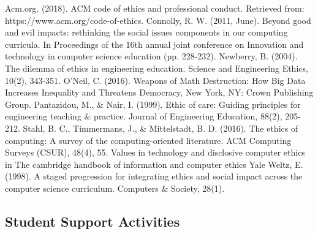 Acm.org. (2018). ACM code of ethics and professional conduct. Retrieved from: https://www.acm.org/code-of-ethics.
Connolly, R. W. (2011, June). Beyond good and evil impacts: rethinking the social issues components in our computing curricula. In Proceedings of the 16th annual joint conference on Innovation and technology in computer science education (pp. 228-232).
Newberry, B. (2004). The dilemma of ethics in engineering education. Science and Engineering Ethics, 10(2), 343-351.
O’Neil, C. (2016). Weapons of Math Destruction: How Big Data Increases Inequality and Threatens Democracy, New York, NY: Crown Publishing Group.
Pantazidou, M., \& Nair, I. (1999). Ethic of care: Guiding principles for engineering teaching \& practice. Journal of Engineering Education, 88(2), 205-212.
Stahl, B. C., Timmermans, J., \& Mittelstadt, B. D. (2016). The ethics of computing: A survey of the computing-oriented literature. ACM Computing Surveys (CSUR), 48(4), 55.
Values in technology and disclosive computer ethics in The cambridge handbook of information and computer ethics 
Yale Weltz, E. (1998). A staged progression for integrating ethics and social impact across the computer science curriculum. Computers \& Society, 28(1).



\subsection{Student Support Activities}

